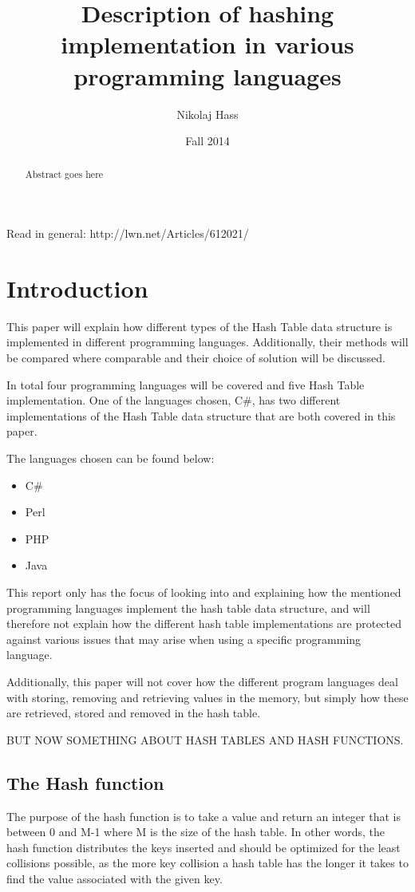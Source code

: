 \documentclass[titlepage]{article}
\author{Nikolaj Hass}
\title{Description of hashing implementation in various programming languages}
\date{Fall 2014}
\begin{document}
	\maketitle

	\begin{abstract}
		Abstract goes here
	\end{abstract}
	

	
	Read in general:	http://lwn.net/Articles/612021/
	\section{Introduction}
	This paper will explain how different types of the Hash Table data structure is implemented in different programming languages. Additionally, their methods will be compared where comparable and their choice of solution will be discussed. 
	
	In total four programming languages will be covered and five Hash Table implementation. One of the languages chosen, C\#{}, has two different implementations of the Hash Table data structure that are both covered in this paper. 
	
	The languages chosen can be found below:
	\begin{itemize}
		\item C\#
		\item Perl
		\item PHP
		\item Java
	\end{itemize}
	
	This report only has the focus of looking into and explaining how the mentioned programming languages implement the hash table data structure, and will therefore not explain how the different hash table implementations are protected against various issues that may arise when using a specific programming language.
	
	Additionally, this paper will not cover how the different program languages deal with storing, removing and retrieving values in the memory, but simply how these are retrieved, stored and removed in the hash table. 
	
	BUT NOW SOMETHING ABOUT HASH TABLES AND HASH FUNCTIONS.
	
	
	
	\subsection{The Hash function}
	The purpose of the hash function is to take a value and return an integer that is between 0 and M-1 where M is the size of the hash table. In other words, the hash function distributes the keys inserted and should be optimized for the least collisions possible, as the more key collision a hash table has the longer it takes to find the value associated with the given key. 
	
\end{document}
